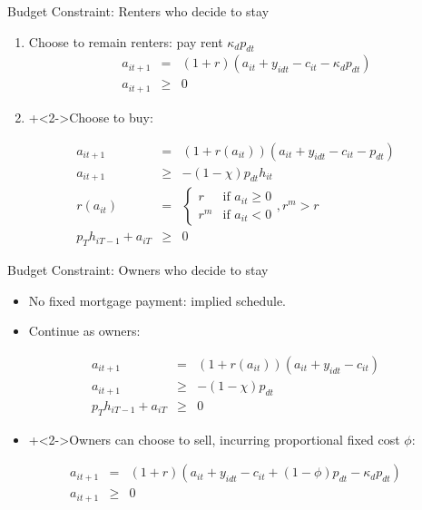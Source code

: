 \documentclass[12pt,english, aspectratio=169]{beamer}
\begin{document}
%
\begin{frame}{Budget Constraint: Renters who decide to stay\hypertarget{BudgetConstraints}{}
\hyperlink{Budgets-origin}{}}
\begin{enumerate}
\item Choose to remain renters: pay rent $\kappa_{d}p_{dt}$
\begin{eqnarray*}
a_{it+1} & = & (1+r)\left(a_{it}+y_{idt}-c_{it}-\kappa_{d}p_{dt}\right)\\
a_{it+1} & \geq & 0
\end{eqnarray*}
\item \onslide+<2->Choose to buy:
\end{enumerate}
\begin{eqnarray*}
a_{it+1} & = & (1+r(a_{it}))\left(a_{it}+y_{idt}-c_{it}-p_{dt}\right)\\
a_{it+1} & \geq & -(1-\chi)p_{dt}h_{it}\\
r(a_{it}) & = & \begin{cases}
r & \text{if }a_{it}\geq0\\
r^{m} & \text{if }a_{it}<0
\end{cases},r^{m}>r\\
p_{T}h_{iT-1}+a_{iT} & \geq & 0
\end{eqnarray*}

\end{frame}
%
\begin{frame}{Budget Constraint: Owners who decide to stay}

\begin{itemize}
\item No fixed mortgage payment: implied schedule.
\item Continue as owners:

\end{itemize}
\begin{eqnarray*}
a_{it+1} & = & (1+r(a_{it}))\left(a_{it}+y_{idt}-c_{it}\right)\\
a_{it+1} & \geq & -(1-\chi)p_{dt}\\
p_{T}h_{iT-1}+a_{iT} & \geq & 0
\end{eqnarray*}

\begin{itemize}
\item \onslide+<2->Owners can choose to sell, incurring proportional fixed
cost $\phi$:

\end{itemize}
\begin{eqnarray*}
a_{it+1} & = & (1+r)\left(a_{it}+y_{idt}-c_{it}+(1-\phi)p_{dt}-\kappa_{d}p_{dt}\right)\\
a_{it+1} & \geq & 0
\end{eqnarray*}

\end{frame}
\end{document}
